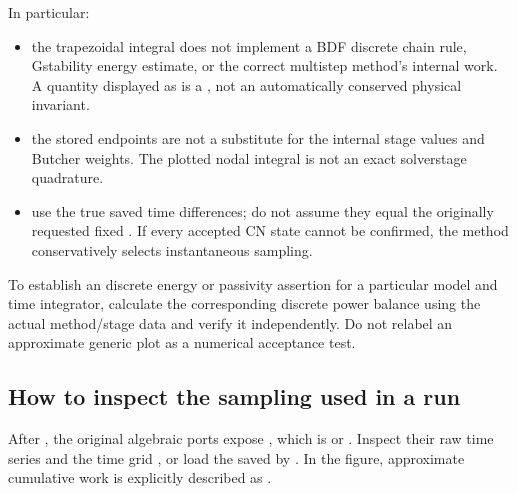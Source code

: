 \documentclass[letterpaper,10pt,english]{sphinxmanual}
\begin{document}
\sphinxAtStartPar
In particular:
\begin{itemize}
\item {} 
\sphinxAtStartPar
{} the trapezoidal integral does not implement a BDF
discrete chain rule, G\sphinxhyphen{}stability energy estimate, or the correct
multistep method’s internal work. A quantity displayed as
 is a ,
not an automatically conserved physical invariant.

\item {} 
\sphinxAtStartPar
{} the stored
endpoints are not a substitute for the internal stage values and
Butcher weights. The plotted nodal integral is not an exact
solver\sphinxhyphen{}stage quadrature.

\item {} 
\sphinxAtStartPar
{} use the true saved
time differences; do not assume they equal the originally
requested fixed . If every accepted CN state cannot be
confirmed, the method conservatively selects instantaneous sampling.

\end{itemize}

\sphinxAtStartPar
To establish an  discrete energy or passivity assertion for a
particular model and time integrator, calculate the corresponding
discrete power balance using the actual method/stage data and verify
it independently. Do not re\sphinxhyphen{}label an approximate generic plot as
a numerical acceptance test.


\subsection{How to inspect the sampling used in a run}
\label{\detokenize{energy_and_power:how-to-inspect-the-sampling-used-in-a-run}}
\sphinxAtStartPar
After , the original algebraic ports expose
, which is  or
. Inspect their raw  time
series and the time grid , or load the
 saved by .
In the figure, approximate cumulative work is explicitly described as
.
\end{document}
